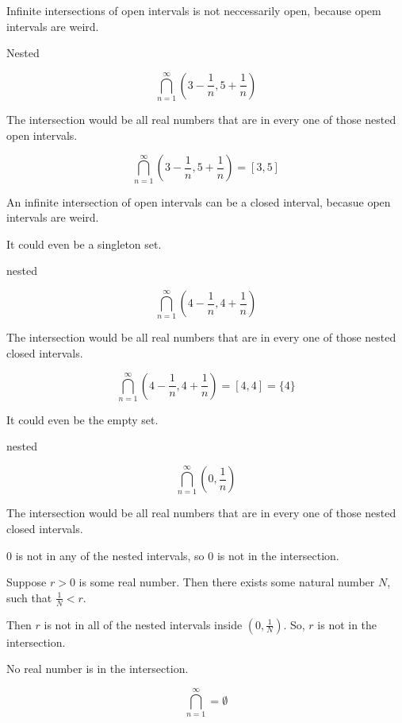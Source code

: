 \documentclass{ximera}
\begin{document}
Infinite intersections of open intervals is not neccessarily open, because opem intervals are weird.


\begin{example} Nested


\[ \bigcap_{n=1}^{\infty}   \left(3 - \frac{1}{n}, 5 + \frac{1}{n}\right)     \]



The intersection would be all real numbers that are in every one of those nested open intervals.


\[ \bigcap_{n=1}^{\infty}   \left(3 - \frac{1}{n}, 5 + \frac{1}{n}\right)  = [3, 5]   \]





\end{example}


An infinite intersection of open intervals can be a closed interval, becasue open intervals are weird.


It could even be a singleton set.




\begin{example} nested


\[ \bigcap_{n=1}^{\infty}   \left(4 - \frac{1}{n}, 4 +  \frac{1}{n}\right)     \]



The intersection would be all real numbers that are in every one of those nested closed intervals.


\[ \bigcap_{n=1}^{\infty}   \left(4 -  \frac{1}{n}, 4 + \frac{1}{n}\right)    = [4, 4] = \{ 4 \}   \]





\end{example}





It could even be the empty set.



\begin{example} nested


\[ \bigcap_{n=1}^{\infty}   \left(0,  \frac{1}{n}\right)     \]



The intersection would be all real numbers that are in every one of those nested closed intervals.


$0$ is not in any of the nested intervals, so $0$ is not in the intersection.


Suppose $r>0$ is some real number.  Then there exists some natural number $N$, such that $\frac{1}{N} < r$.

Then $r$ is not in all of the nested intervals inside $\left(0,  \frac{1}{N}\right)$. So, $r$ is not in the intersection.


No real number is in the intersection.


\[ \bigcap_{n=1}^{\infty}   = \emptyset    \]



\end{example}
\end{document}
